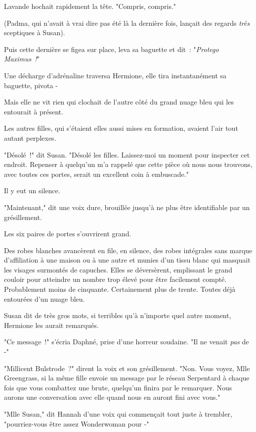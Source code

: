 Lavande hochait rapidement la tête. "Compris, compris."

(Padma, qui n'avait à vrai dire pas été là la dernière fois, lançait des regards \emph{très} sceptiques à Susan).

Puis cette dernière se figea sur place, leva sa baguette et dit~: "\emph{Protego Maximus~!}"

Une décharge d'adrénaline traversa Hermione, elle tira instantanément sa baguette, pivota -

Mais elle ne vit rien qui clochait de l'autre côté du grand nuage bleu qui les entourait à présent.

Les autres filles, qui s'étaient elles aussi mises en formation, avaient l'air tout autant perplexes.

"Désolé~!" dit Susan. "Désolé les filles. Laissez-moi un moment pour inspecter cet endroit. Repenser à quelqu'un m'a rappelé que cette pièce où nous nous trouvons, avec toutes ces portes, serait un excellent coin à embuscade."

Il y eut un silence.

"Maintenant," dit une voix dure, brouillée jusqu'à ne plus être identifiable par un grésillement.

Les six paires de portes s'ouvrirent grand.

Des robes blanches avancèrent en file, en silence, des robes intégrales sans marque d'affiliation à une maison ou à une autre et munies d'un tissu blanc qui masquait les visages surmontés de capuches. Elles se déversèrent, emplissant le grand couloir pour atteindre un nombre trop élevé pour être facilement compté. Probablement moins de cinquante. Certainement plus de trente. Toutes déjà entourées d'un nuage bleu.

Susan dit de très gros mots, si terribles qu'à n'importe quel autre moment, Hermione les aurait remarqués.

"Ce message~!" s'écria Daphné, prise d'une horreur soudaine. "Il ne venait \emph{pas} de -"

"Millicent Bulstrode~?" dirent la voix et son grésillement. "Non. Vous voyez, Mlle Greengrass, si la même fille envoie un message par le réseau Serpentard à chaque fois que vous combattez une brute, quelqu'un finira par le remarquer. Nous aurons une conversation avec elle quand nous en auront fini avec vous."

"Mlle Susan," dit Hannah d'une voix qui commençait tout juste à trembler, "pourriez-vous être assez Wonderwoman pour -"

